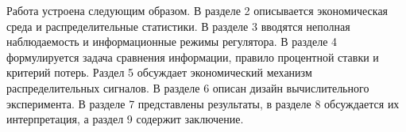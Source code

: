 Работа устроена следующим образом. В разделе 2 описывается экономическая среда и распределительные
статистики. В разделе 3 вводятся неполная наблюдаемость и информационные режимы регулятора. В
разделе 4 формулируется задача сравнения информации, правило процентной ставки и критерий
потерь. Раздел 5 обсуждает экономический механизм распределительных сигналов. В разделе 6
описан дизайн вычислительного эксперимента. В разделе 7 представлены результаты, в разделе 8
обсуждается их интерпретация, а раздел 9 содержит заключение.

